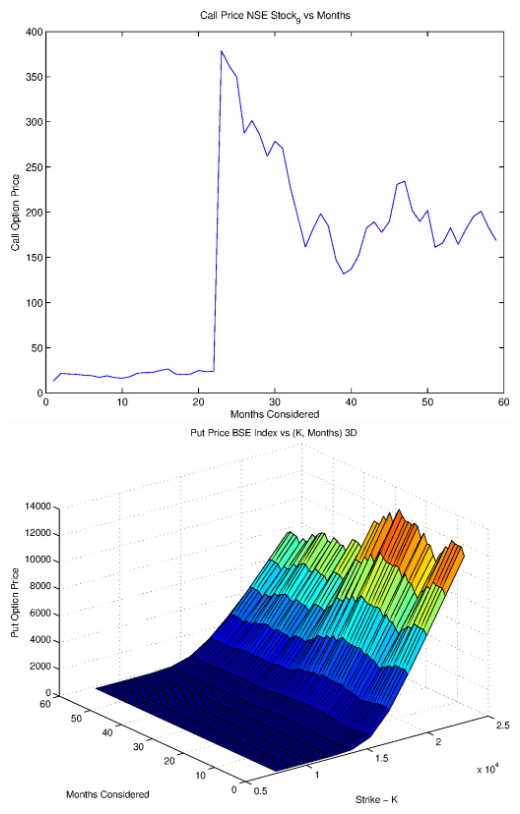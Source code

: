 \documentclass{article}
\begin{document}
\includegraphics[width=\textwidth]{Call_Price_NSE_Stock_9_vs_Months} \\

\includegraphics[width=\textwidth]{Put_Price_BSE_Index_vs_(K,_Months)_3D} \\
\end{document}
